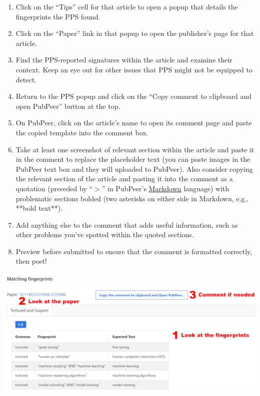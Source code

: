 \documentclass[letterpaper, 12pt]{article}
\begin{document}
\begin{enumerate}
    \setlength\itemsep{-0.5em}
    \item Click on the ``Tips'' cell for that article to open a popup that details the fingerprints the PPS found.
    \item Click on the ``Paper'' link in that popup to open the publisher's page for that article.
    \item Find the PPS-reported signatures within the article and examine their context. Keep an eye out for other issues that PPS might not be equipped to detect.
    \item Return to the PPS popup and click on the ``Copy comment to clipboard and open PubPeer'' button at the top.
    \item On PubPeer, click on the article's name to open its comment page and paste the copied template into the comment box.
    \item Take at least one screenshot of relevant section within the article and paste it in the comment to replace the placeholder text (you can paste images in the PubPeer text box and they will uploaded to PubPeer). Also consider copying the relevant section of the article and pasting it into the comment as a quotation (preceded by ``$>$'' in PubPeer's \href{https://pubpeer.com/static/markdown}{Markdown} language) with problematic sections bolded (two asterisks on either side in Markdown, e.g., **bold text**).
    \item Add anything else to the comment that adds useful information, such as other problems you've spotted within the quoted sections.
    \item Preview before submitted to ensure that the comment is formatted correctly, then post!
\end{enumerate}

\includegraphics[width=\linewidth]{img/getting_started/process_reduced.png}
\end{document}
